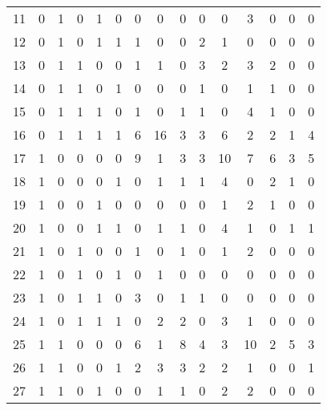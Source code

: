 \begin{small}
\begin{threeparttable}[h]
\begin{tabular}{c|ccccc|ccccc|cccc}
11  &   0   &   1   &   0   &   1   &   0   &   0   &   0   &   0   &   0   &   0   &   3   &   0   &   0   &   0   \\
12  &   0   &   1   &   0   &   1   &   1   &   1   &   0   &   0   &   2   &   1   &   0   &   0   &   0   &   0   \\
13  &   0   &   1   &   1   &   0   &   0   &   1   &   1   &   0   &   3   &   2   &   3   &   2   &   0   &   0   \\
14  &   0   &   1   &   1   &   0   &   1   &   0   &   0   &   0   &   1   &   0   &   1   &   1   &   0   &   0   \\
15  &   0   &   1   &   1   &   1   &   0   &   1   &   0   &   1   &   1   &   0   &   4   &   1   &   0   &   0   \\
16  &   0   &   1   &   1   &   1   &   1   &   6   &   16  &   3   &   3   &   6   &   2   &   2   &   1   &   4   \\
17  &   1   &   0   &   0   &   0   &   0   &   9   &   1   &   3   &   3   &   10  &   7   &   6   &   3   &   5   \\
18  &   1   &   0   &   0   &   0   &   1   &   0   &   1   &   1   &   1   &   4   &   0   &   2   &   1   &   0   \\
19  &   1   &   0   &   0   &   1   &   0   &   0   &   0   &   0   &   0   &   1   &   2   &   1   &   0   &   0   \\
20  &   1   &   0   &   0   &   1   &   1   &   0   &   1   &   1   &   0   &   4   &   1   &   0   &   1   &   1   \\
21  &   1   &   0   &   1   &   0   &   0   &   1   &   0   &   1   &   0   &   1   &   2   &   0   &   0   &   0   \\
22  &   1   &   0   &   1   &   0   &   1   &   0   &   1   &   0   &   0   &   0   &   0   &   0   &   0   &   0   \\
23  &   1   &   0   &   1   &   1   &   0   &   3   &   0   &   1   &   1   &   0   &   0   &   0   &   0   &   0   \\
24  &   1   &   0   &   1   &   1   &   1   &   0   &   2   &   2   &   0   &   3   &   1   &   0   &   0   &   0   \\
25  &   1   &   1   &   0   &   0   &   0   &   6   &   1   &   8   &   4   &   3   &   10  &   2   &   5   &   3   \\
26  &   1   &   1   &   0   &   0   &   1   &   2   &   3   &   3   &   2   &   2   &   1   &   0   &   0   &   1   \\
27  &   1   &   1   &   0   &   1   &   0   &   0   &   1   &   1   &   0   &   2   &   2   &   0   &   0   &   0   \\

\end{tabular}
\end{threeparttable}
\end{small}

